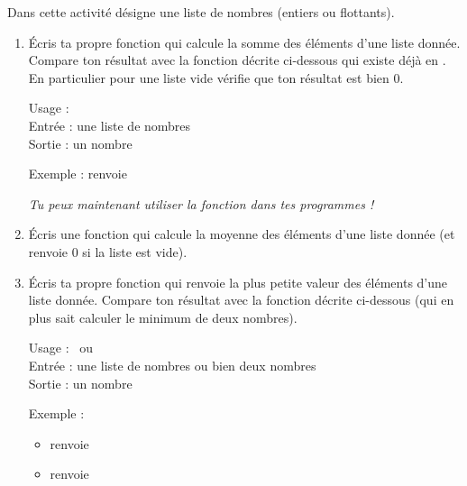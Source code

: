 \documentclass[11pt,class=report,crop=false]{standalone}
\begin{document}
\begin{activite}


Dans cette activité  désigne une liste de nombres (entiers ou flottants). 

\begin{enumerate}
  \item Écris ta propre fonction  qui calcule la somme des éléments d'une liste donnée.
  Compare ton résultat avec la fonction  décrite ci-dessous qui existe déjà en \Python{}. En particulier pour une liste vide vérifie que ton résultat est bien $0$. 
  
  
  \begin{fonctionpython}
   Usage : \\
   Entrée : une liste de nombres\\
   Sortie : un nombre
  
  \medskip
     
   Exemple :  renvoie 
  \end{fonctionpython}   
  
  \emph{Tu peux maintenant utiliser la fonction  dans tes programmes !}
  
  
  \item Écris une fonction  qui calcule la moyenne des éléments d'une liste donnée (et renvoie $0$ si la liste est vide).
  
  \item Écris ta propre fonction  qui renvoie la plus petite valeur des éléments d'une liste donnée. Compare ton résultat avec la fonction \Python{}  décrite ci-dessous (qui en plus sait calculer le minimum de deux nombres).
  
  
  \begin{fonctionpython}
   Usage :  \  ou \  \\
   Entrée : une liste de nombres ou bien deux nombres\\
   Sortie : un nombre
  
  \medskip
     
   Exemple : 
  \begin{itemize}  
    \item {} renvoie   
    \item {} renvoie 
  \end{itemize}    


\end{fonctionpython}
\end{enumerate}
\end{activite}
\end{document}
